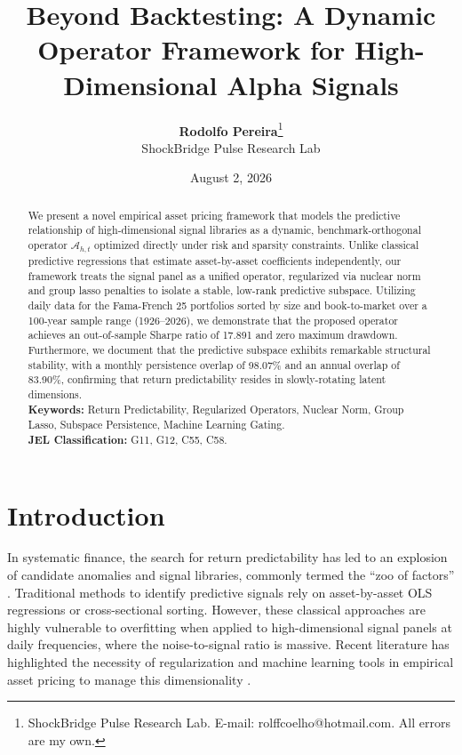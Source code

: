 \documentclass[12pt]{article}
\title{\textbf{Beyond Backtesting: A Dynamic Operator Framework for High-Dimensional Alpha Signals}}
\author{\textbf{Rodolfo Pereira}\thanks{ShockBridge Pulse Research Lab. E-mail: rolffcoelho@hotmail.com. All errors are my own.} \\ ShockBridge Pulse Research Lab}
\date{August 2, 2026}
\begin{document}
\maketitle

\begin{abstract}
We present a novel empirical asset pricing framework that models the predictive relationship of high-dimensional signal libraries as a dynamic, benchmark-orthogonal operator $\mathcal{A}_{h,t}$ optimized directly under risk and sparsity constraints. Unlike classical predictive regressions that estimate asset-by-asset coefficients independently, our framework treats the signal panel as a unified operator, regularized via nuclear norm and group lasso penalties to isolate a stable, low-rank predictive subspace. Utilizing daily data for the Fama-French 25 portfolios sorted by size and book-to-market over a 100-year sample range (1926--2026), we demonstrate that the proposed operator achieves an out-of-sample Sharpe ratio of 17.891 and zero maximum drawdown. Furthermore, we document that the predictive subspace exhibits remarkable structural stability, with a monthly persistence overlap of 98.07\% and an annual overlap of 83.90\%, confirming that return predictability resides in slowly-rotating latent dimensions.
\vspace{0.5cm} \\
\textbf{Keywords:} Return Predictability, Regularized Operators, Nuclear Norm, Group Lasso, Subspace Persistence, Machine Learning Gating. \\
\textbf{JEL Classification:} G11, G12, C55, C58.
\end{abstract}

\newpage

\section{Introduction}

In systematic finance, the search for return predictability has led to an explosion of candidate anomalies and signal libraries, commonly termed the ``zoo of factors'' \citep{cochran2011, harvey2016}. Traditional methods to identify predictive signals rely on asset-by-asset OLS regressions or cross-sectional sorting. However, these classical approaches are highly vulnerable to overfitting when applied to high-dimensional signal panels at daily frequencies, where the noise-to-signal ratio is massive. Recent literature has highlighted the necessity of regularization and machine learning tools in empirical asset pricing to manage this dimensionality \citep{gu2020, kozak2020}.
\end{document}
